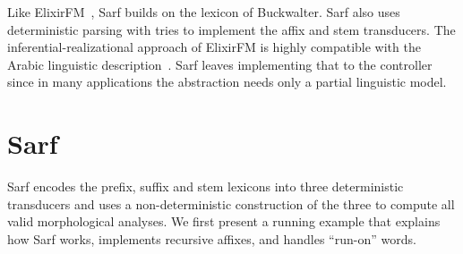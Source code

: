 \documentclass[11pt]{article}
\begin{document}
Like ElixirFM~\cite{Otakar:07}, Sarf builds on the lexicon
of Buckwalter. %
Sarf also uses deterministic parsing with tries 
to implement the affix and stem transducers. 
The inferential-realizational approach 
of ElixirFM
is highly compatible with the Arabic linguistic 
description~\cite{Badawi:04}.
Sarf leaves implementing that to the %
controller
since in many applications the abstraction needs only a partial 
linguistic model. 


\section{Sarf}
\label{sec:sarf}


Sarf encodes the prefix, suffix and stem lexicons into
three deterministic transducers and 
uses a non-deterministic construction
of the three to compute all valid morphological analyses.
We first present a running example 
that 
explains how Sarf works,
implements recursive affixes, and
handles ``run-on'' words.


\transfalse
\begin{figure}[tb]
\end{figure}
\end{document}
